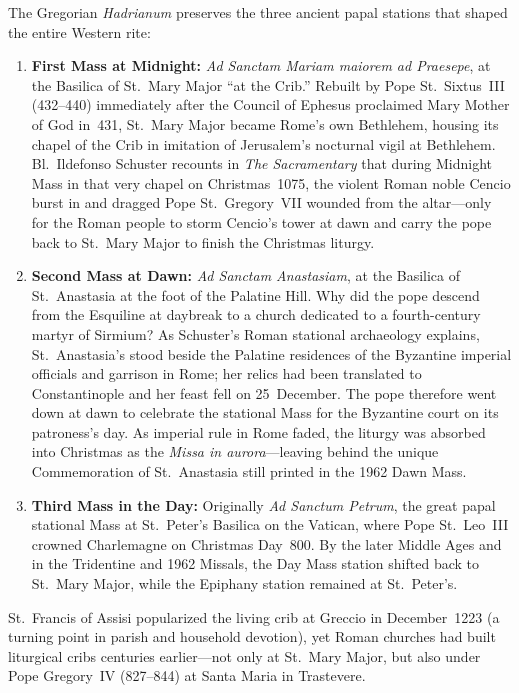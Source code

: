 The Gregorian \textit{Hadrianum} preserves the three ancient papal stations
that shaped the entire Western rite:

\begin{enumerate}
\item \textbf{First Mass at Midnight:} \textit{Ad Sanctam Mariam maiorem ad
Praesepe}, at the Basilica of St.~Mary Major ``at the Crib.'' Rebuilt by Pope
St.~Sixtus~III (432--440) immediately after the Council of Ephesus proclaimed
Mary Mother of God in~431, St.~Mary Major became Rome's own Bethlehem, housing
its chapel of the Crib in imitation of Jerusalem's nocturnal vigil at Bethlehem.
Bl.~Ildefonso Schuster recounts in \textit{The Sacramentary} that during
Midnight Mass in that very chapel on Christmas~1075, the violent Roman noble
Cencio burst in and dragged Pope St.~Gregory~VII wounded from the altar---only
for the Roman people to storm Cencio's tower at dawn and carry the pope back to
St.~Mary Major to finish the Christmas liturgy.
\item \textbf{Second Mass at Dawn:} \textit{Ad Sanctam Anastasiam}, at the
Basilica of St.~Anastasia at the foot of the Palatine Hill. Why did the pope
descend from the Esquiline at daybreak to a church dedicated to a fourth-century
martyr of Sirmium? As Schuster's Roman stational archaeology explains,
St.~Anastasia's stood beside the Palatine residences of the Byzantine imperial
officials and garrison in Rome; her relics had been translated to Constantinople
and her feast fell on 25~December. The pope therefore went down at dawn to
celebrate the stational Mass for the Byzantine court on its patroness's day. As
imperial rule in Rome faded, the liturgy was absorbed into Christmas as the
\textit{Missa in aurora}---leaving behind the unique Commemoration of
St.~Anastasia still printed in the 1962 Dawn Mass.
\item \textbf{Third Mass in the Day:} Originally \textit{Ad Sanctum Petrum},
the great papal stational Mass at St.~Peter's Basilica on the Vatican, where
Pope St.~Leo~III crowned Charlemagne on Christmas Day~800. By the later Middle
Ages and in the Tridentine and 1962 Missals, the Day Mass station shifted back
to St.~Mary Major, while the Epiphany station remained at St.~Peter's.
\end{enumerate}

St.~Francis of Assisi popularized the living crib at Greccio in December~1223
(a turning point in parish and household devotion), yet Roman churches had built
liturgical cribs centuries earlier---not only at St.~Mary Major, but also under
Pope Gregory~IV (827--844) at Santa Maria in Trastevere.

